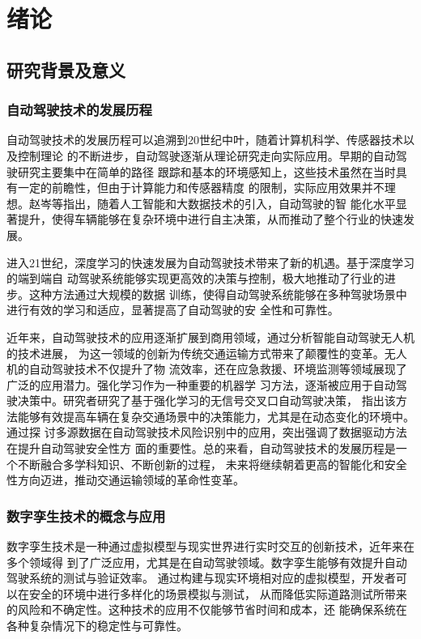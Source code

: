 \chapter{绪论}



\section{研究背景及意义}

\subsection{自动驾驶技术的发展历程}

自动驾驶技术的发展历程可以追溯到20世纪中叶，随着计算机科学、传感器技术以及控制理论
的不断进步，自动驾驶逐渐从理论研究走向实际应用。早期的自动驾驶研究主要集中在简单的路径
跟踪和基本的环境感知上，这些技术虽然在当时具有一定的前瞻性，但由于计算能力和传感器精度
的限制，实际应用效果并不理想。赵岑等指出，随着人工智能和大数据技术的引入，自动驾驶的智
能化水平显著提升，使得车辆能够在复杂环境中进行自主决策，从而推动了整个行业的快速发展。

进入21世纪，深度学习的快速发展为自动驾驶技术带来了新的机遇。基于深度学习的端到端自
动驾驶系统能够实现更高效的决策与控制，极大地推动了行业的进步。这种方法通过大规模的数据
训练，使得自动驾驶系统能够在多种驾驶场景中进行有效的学习和适应，显著提高了自动驾驶的安
全性和可靠性。

近年来，自动驾驶技术的应用逐渐扩展到商用领域，通过分析智能自动驾驶无人机的技术进展，
为这一领域的创新为传统交通运输方式带来了颠覆性的变革。无人机的自动驾驶技术不仅提升了物
流效率，还在应急救援、环境监测等领域展现了广泛的应用潜力。强化学习作为一种重要的机器学
习方法，逐渐被应用于自动驾驶决策中。研究者研究了基于强化学习的无信号交叉口自动驾驶决策，
指出该方法能够有效提高车辆在复杂交通场景中的决策能力，尤其是在动态变化的环境中。通过探
讨多源数据在自动驾驶技术风险识别中的应用，突出强调了数据驱动方法在提升自动驾驶安全性方
面的重要性。总的来看，自动驾驶技术的发展历程是一个不断融合多学科知识、不断创新的过程，
未来将继续朝着更高的智能化和安全性方向迈进，推动交通运输领域的革命性变革。

\subsection{数字孪生技术的概念与应用}

数字孪生技术是一种通过虚拟模型与现实世界进行实时交互的创新技术，近年来在多个领域得
到了广泛应用，尤其是在自动驾驶领域。数字孪生能够有效提升自动驾驶系统的测试与验证效率。
通过构建与现实环境相对应的虚拟模型，开发者可以在安全的环境中进行多样化的场景模拟与测试，
从而降低实际道路测试所带来的风险和不确定性。这种技术的应用不仅能够节省时间和成本，还
能确保系统在各种复杂情况下的稳定性与可靠性。

